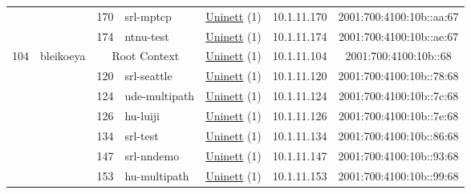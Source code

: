 \begin{small}
\begin{center}
\begin{longtable}{|c|c|c|c|c|c|c|c|}
  &  & \tiny{170} & \multicolumn{1}{|l|}{\tiny{srl-mptcp}} & \multicolumn{2}{|c|}{\tiny{\href{https://www.uninett.no}{Uninett} (1)}} & \tiny{10.1.11.170} & \tiny{2001:700:4100:10b::aa:67} \\* \cline{3-3}\cline{4-4}\cline{5-5}\cline{6-6}\cline{7-7}\cline{8-8}
  &  & \tiny{174} & \multicolumn{1}{|l|}{\tiny{ntnu-test}} & \multicolumn{2}{|c|}{\tiny{\href{https://www.uninett.no}{Uninett} (1)}} & \tiny{10.1.11.174} & \tiny{2001:700:4100:10b::ae:67} \\ \hline
 \multirow{9}{*}{\tiny{104}} & \multicolumn{1}{|l|}{\multirow{9}{*}{\tiny{bleikoeya}}} & \multicolumn{2}{|c|}{\tiny{Root Context}} & \multicolumn{2}{|c|}{\tiny{\href{https://www.uninett.no}{Uninett} (1)}} & \tiny{10.1.11.104} & \tiny{2001:700:4100:10b::68} \\* \cline{3-3}\cline{4-4}\cline{5-5}\cline{6-6}\cline{7-7}\cline{8-8}
  &  & \tiny{120} & \multicolumn{1}{|l|}{\tiny{srl-seattle}} & \multicolumn{2}{|c|}{\tiny{\href{https://www.uninett.no}{Uninett} (1)}} & \tiny{10.1.11.120} & \tiny{2001:700:4100:10b::78:68} \\* \cline{3-3}\cline{4-4}\cline{5-5}\cline{6-6}\cline{7-7}\cline{8-8}
  &  & \tiny{124} & \multicolumn{1}{|l|}{\tiny{ude-multipath}} & \multicolumn{2}{|c|}{\tiny{\href{https://www.uninett.no}{Uninett} (1)}} & \tiny{10.1.11.124} & \tiny{2001:700:4100:10b::7c:68} \\* \cline{3-3}\cline{4-4}\cline{5-5}\cline{6-6}\cline{7-7}\cline{8-8}
  &  & \tiny{126} & \multicolumn{1}{|l|}{\tiny{hu-luiji}} & \multicolumn{2}{|c|}{\tiny{\href{https://www.uninett.no}{Uninett} (1)}} & \tiny{10.1.11.126} & \tiny{2001:700:4100:10b::7e:68} \\* \cline{3-3}\cline{4-4}\cline{5-5}\cline{6-6}\cline{7-7}\cline{8-8}
  &  & \tiny{134} & \multicolumn{1}{|l|}{\tiny{srl-test}} & \multicolumn{2}{|c|}{\tiny{\href{https://www.uninett.no}{Uninett} (1)}} & \tiny{10.1.11.134} & \tiny{2001:700:4100:10b::86:68} \\* \cline{3-3}\cline{4-4}\cline{5-5}\cline{6-6}\cline{7-7}\cline{8-8}
  &  & \tiny{147} & \multicolumn{1}{|l|}{\tiny{srl-nndemo}} & \multicolumn{2}{|c|}{\tiny{\href{https://www.uninett.no}{Uninett} (1)}} & \tiny{10.1.11.147} & \tiny{2001:700:4100:10b::93:68} \\* \cline{3-3}\cline{4-4}\cline{5-5}\cline{6-6}\cline{7-7}\cline{8-8}
  &  & \tiny{153} & \multicolumn{1}{|l|}{\tiny{hu-multipath}} & \multicolumn{2}{|c|}{\tiny{\href{https://www.uninett.no}{Uninett} (1)}} & \tiny{10.1.11.153} & \tiny{2001:700:4100:10b::99:68} \\* \cline{3-3}\cline{4-4}\cline{5-5}\cline{6-6}\cline{7-7}\cline{8-8}

\end{longtable}
\end{center}
\end{small}
